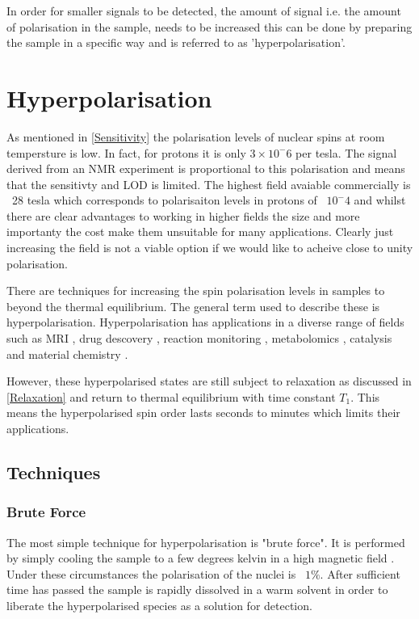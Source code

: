  In order for smaller signals to be detected, the amount of signal i.e. the amount of polarisation in the sample,
 needs to be increased this can be done by preparing the sample in a specific way and is referred to as
 'hyperpolarisation'.

 \section{Hyperpolarisation}

As mentioned in \ref{Sensitivity} the polarisation levels of nuclear spins at room tempersture is low. In fact,
for protons it is only $3\times10^-6$ per tesla\citep{RN138}. The signal derived from an NMR experiment
is proportional to this polarisation and means that the sensitivty and LOD is limited. The highest
field avaiable commercially is ~28 tesla which corresponds to polarisaiton levels in protons of ~$10^-4$ and
whilst there are clear advantages to working in higher fields the size and more importanty the
cost make them unsuitable for many applications. Clearly just increasing the field is not a viable
option if we would like to acheive close to unity polarisation.

There are techniques for increasing the spin polarisation levels in samples to beyond the thermal
equilibrium. The general term used to describe these is hyperpolarisation. Hyperpolarisation has
applications in a diverse range of fields such as MRI \citep{RN139,RN140,RN151,RN152}, drug descovery
\citep{RN141,RN142}, reaction monitoring \citep{RN143,RN144,RN145}, metabolomics \citep{RN147,RN148},
catalysis\citep{RN149, RN150} and material chemistry \citep{RN153,piveteau2015structure,RN154}.

However, these hyperpolarised states are still subject to relaxation as discussed in \ref{Relaxation} and
return to thermal equilibrium with time constant $T_1$. This means the hyperpolarised spin order lasts seconds
to minutes which limits their applications.

\subsection{Techniques}

\subsubsection{Brute Force}

The most simple technique for hyperpolarisation is "brute force". It is performed by simply
cooling the sample to a few degrees kelvin in a high magnetic field \citep{RN155,RN157}. Under
these circumstances the polarisation of the nuclei is ~$1\%$. After sufficient time has passed
the sample is rapidly dissolved in a warm solvent in order to liberate the hyperpolarised
species as a solution for detection.

